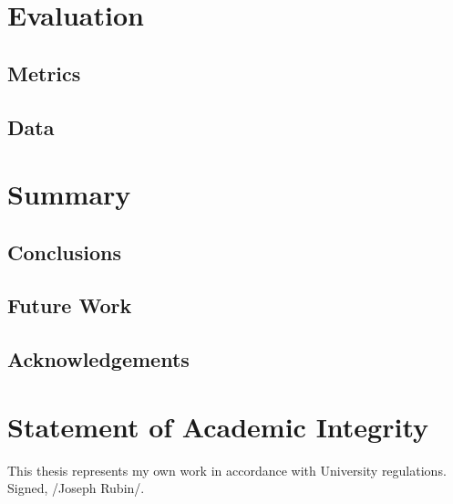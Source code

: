 \documentclass{article}
\begin{document}
\section{Evaluation}
\subsection{Metrics}
\subsection{Data}
\section{Summary}
\subsection{Conclusions}
\subsection{Future Work}
\subsection{Acknowledgements}
\section*{Statement of Academic Integrity}
This thesis represents my own work in accordance with University regulations.\\
Signed, /Joseph Rubin/.

%
%
\end{document}
